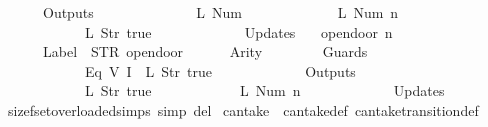 \begin{isabellebody}
\ \ \ \ \ \ Outputs\ {\isacharequal}\ {\isacharbrackleft}\isanewline
\ \ \ \ \ \ \ \ \ \ \ \ {\isacharparenleft}L\ {\isacharparenleft}Num\ {}{\isacharparenright}{\isacharparenright}{\isacharcomma}\isanewline
\ \ \ \ \ \ \ \ \ \ \ \ {\isacharparenleft}L\ {\isacharparenleft}Num\ n{\isacharparenright}{\isacharparenright}{\isacharcomma}\isanewline
\ \ \ \ \ \ \ \ \ \ \ \ {\isacharparenleft}L\ {\isacharparenleft}Str\ {\isacharprime}{\isacharprime}true{\isacharprime}{\isacharprime}{\isacharparenright}{\isacharparenright}\isanewline
\ \ \ \ \ \ {\isacharbrackright}{\isacharcomma}\isanewline
\ \ \ \ \ \ Updates\ {\isacharequal}\ {\isacharbrackleft}{\isacharbrackright}\isanewline
{\isasymrparr}{\isachardoublequoteclose}\isanewline
\isanewline
{}\isamarkupfalse%
\ {\isachardoublequoteopen}opendoor\ n\ {\isasymequiv}\ {\isasymlparr}\isanewline
\ \ \ \ \ \ Label\ {\isacharequal}\ STR\ {\isacharprime}{\isacharprime}opendoor{\isacharprime}{\isacharprime}{\isacharcomma}\isanewline
\ \ \ \ \ \ Arity\ {\isacharequal}\ {}{\isacharcomma}\isanewline
\ \ \ \ \ \ Guards\ {\isacharequal}\ {\isacharbrackleft}\isanewline
\ \ \ \ \ \ \ \ \ \ \ \ {\isacharparenleft}Eq\ {\isacharparenleft}V\ {\isacharparenleft}I\ {}{\isacharparenright}{\isacharparenright}\ {\isacharparenleft}L\ {\isacharparenleft}Str\ {\isacharprime}{\isacharprime}true{\isacharprime}{\isacharprime}{\isacharparenright}{\isacharparenright}{\isacharparenright}\isanewline
\ \ \ \ \ \ {\isacharbrackright}{\isacharcomma}\isanewline
\ \ \ \ \ \ Outputs\ {\isacharequal}\ {\isacharbrackleft}\isanewline
\ \ \ \ \ \ \ \ \ \ \ \ {\isacharparenleft}L\ {\isacharparenleft}Str\ {\isacharprime}{\isacharprime}true{\isacharprime}{\isacharprime}{\isacharparenright}{\isacharparenright}{\isacharcomma}\isanewline
\ \ \ \ \ \ \ \ \ \ \ \ {\isacharparenleft}L\ {\isacharparenleft}Num\ n{\isacharparenright}{\isacharparenright}\isanewline
\ \ \ \ \ \ {\isacharbrackright}{\isacharcomma}\isanewline
\ \ \ \ \ \ Updates\ {\isacharequal}\ {\isacharbrackleft}{\isacharbrackright}\isanewline
{\isasymrparr}{\isachardoublequoteclose}\isanewline
\isanewline
{}\isamarkupfalse%
\ size{\isacharunderscore}fset{\isacharunderscore}overloaded{\isacharunderscore}simps\ {\isacharbrackleft}simp\ del{\isacharbrackright}\isanewline
\isanewline
{}\isamarkupfalse%
\ can{\isacharunderscore}take\ {\isacharequal}\ can{\isacharunderscore}take{\isacharunderscore}def\ can{\isacharunderscore}take{\isacharunderscore}transition{\isacharunderscore}def\isanewline
\isanewline
{}\isamarkupfalse%

\end{isabellebody}
